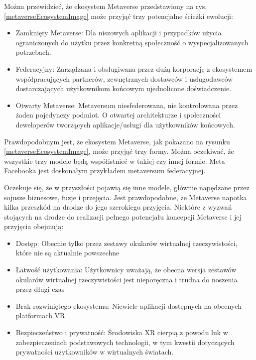 Można przewidzieć, że ekosystem Metaverse przedstawiony na rys.\ref{metaverseEcosystemImage} może przyjąć trzy potencjalne ścieżki ewolucji:

\begin{itemize}
    \item Zamknięty Metaverse: Dla niszowych aplikacji i przypadków użycia ograniczonych do użytku przez konkretną społeczność o wyspecjalizowanych potrzebach.
    \item Federacyjny: Zarządzana i obsługiwana przez dużą korporację z ekosystemem współpracujących partnerów, zewnętrznych dostawców i usługodawców dostarczających użytkownikom końcowym ujednolicone doświadczenie.
    \item Otwarty Metaverse: Metaversum niesfederowana, nie kontrolowana przez żaden pojedynczy podmiot. O otwartej architekturze i społeczności deweloperów tworzących aplikacje/usługi dla użytkowników końcowych.
\end{itemize}



Prawdopodobnym jest, że ekosystem Metaverse, jak pokazano na rysunku \ref{metaverseEcosystemImage}, może przyjąć trzy formy. Można oczekiwać, że wszystkie trzy modele będą współistnieć w takiej czy innej formie. Meta Facebooka jest doskonałym przykładem metaversum federacyjnej\cite{metaverseSecurityIssuesChallengesAndViableZTAModel}. 

Oczekuje się, że w przyszłości pojawią się inne modele, głównie napędzane przez sojusze biznesowe, fuzje i przejęcia. Jest prawdopodobne, że Metaverse napotka kilka przeszkód na drodze do jego szerokiego przyjęcia. Niektóre z wyzwań stojących na drodze do realizacji pełnego potencjału koncepcji Metaverse i jej przyjęcia obejmują:

\begin{itemize}
    \item Dostęp: Obecnie tylko przez zestawy okularów wirtualnej rzeczywistości, które nie są aktualnie powszechne
    \item Łatwość użytkowania: Użytkownicy uważają, że obecna wersja zestawów okularów wirtualnej rzeczywistości jest nieporęczna i trudna do noszenia przez długi czas
    \item Brak rozwiniętego ekosystemu: Niewiele aplikacji dostępnych na obecnych platformach VR
    \item Bezpieczeństwo i prywatność: Środowiska XR cierpią z powodu luk w zabezpieczeniach podstawowych technologii, w tym kwestii dotyczących prywatności użytkowników w wirtualnych światach. 
\end{itemize}

